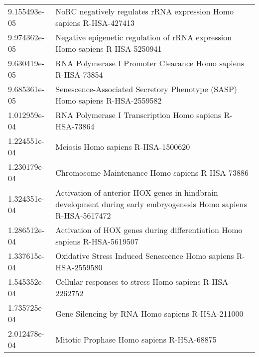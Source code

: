 \begin{longtable}{p{2.4cm}p{14.5cm}}
             9.155493e-05 &                                                                   NoRC negatively regulates rRNA expression Homo sapiens R-HSA-427413 \\
             9.974362e-05 &                                                          Negative epigenetic regulation of rRNA expression Homo sapiens R-HSA-5250941 \\
             9.630419e-05 &                                                                          RNA Polymerase I Promoter Clearance Homo sapiens R-HSA-73854 \\
             9.685361e-05 &                                                           Senescence-Associated Secretory Phenotype (SASP) Homo sapiens R-HSA-2559582 \\
             1.012959e-04 &                                                                               RNA Polymerase I Transcription Homo sapiens R-HSA-73864 \\
             1.224551e-04 &                                                                                                    Meiosis Homo sapiens R-HSA-1500620 \\
             1.230179e-04 &                                                                                       Chromosome Maintenance Homo sapiens R-HSA-73886 \\
             1.324351e-04 &                       Activation of anterior HOX genes in hindbrain development during early embryogenesis Homo sapiens R-HSA-5617472 \\
             1.286512e-04 &                                                             Activation of HOX genes during differentiation Homo sapiens R-HSA-5619507 \\
             1.337615e-04 &                                                                        Oxidative Stress Induced Senescence Homo sapiens R-HSA-2559580 \\
             1.545352e-04 &                                                                               Cellular responses to stress Homo sapiens R-HSA-2262752 \\
             1.735725e-04 &                                                                                       Gene Silencing by RNA Homo sapiens R-HSA-211000 \\
             2.012478e-04 &                                                                                             Mitotic Prophase Homo sapiens R-HSA-68875 \\

\end{longtable}
